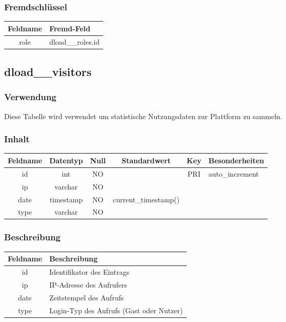 \subsubsection{Fremdschlüssel}
\begin{table}[H]
	\begin{tabular}{|c|p{12.5cm}|}
		\hline
		\textbf{Feldname} & \textbf{Fremd-Feld} \\ \hline
		role & dload\_\_roles.id \\ \hline
	\end{tabular}
\end{table}
\subsection{dload\_\_visitors}
\subsubsection{Verwendung} Diese Tabelle wird verwendet um statistische Nutzungsdaten zur Plattform zu sammeln.
\subsubsection{Inhalt}
\begin{table}[H]
	\begin{tabular}{|c|c|c|c|c|p{3.5cm}|}
		\hline
		\textbf{Feldname} & \textbf{Datentyp} & \textbf{Null} & \textbf{Standardwert} & \textbf{Key}   & \textbf{Besonderheiten} \\ \hline
		id & int & NO &  & PRI & auto\_increment \\ \hline
		ip & varchar & NO &  &  & \\ \hline
		date & timestamp & NO & current\_timestamp() &  & \\ \hline
		type & varchar & NO &  &  & \\ \hline
	\end{tabular}
\end{table}
\subsubsection{Beschreibung}
\begin{table}[H]
	\begin{tabular}{|c|p{12cm}|}
		\hline
		\textbf{Feldname} & \textbf{Beschreibung} \\ \hline
		id & Identifikator des Eintrags \\ \hline
		ip & IP-Adresse des Aufrufers \\ \hline
		date & Zeitstempel des Aufrufs \\ \hline
		type & Login-Typ des Aufrufs (Gast oder Nutzer) \\ \hline
	\end{tabular}
\end{table}
